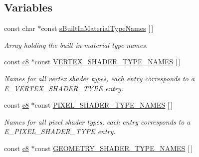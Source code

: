 \subsection*{Variables}
\begin{DoxyCompactItemize}
\item 
\mbox{\label{namespaceirr_1_1video_a833460ba01098710b6df3ec5c281c873}} 
const char $\ast$const \hyperlink{namespaceirr_1_1video_a833460ba01098710b6df3ec5c281c873}{s\+Built\+In\+Material\+Type\+Names} \mbox{[}$\,$\mbox{]}
\begin{DoxyCompactList}\small\item\em Array holding the built in material type names. \end{DoxyCompactList}\item 
\mbox{\label{namespaceirr_1_1video_a296c30d8c7591c4e083f7b7e2d4b35ad}} 
const \hyperlink{namespaceirr_a9395eaea339bcb546b319e9c96bf7410}{c8} $\ast$const \hyperlink{namespaceirr_1_1video_a296c30d8c7591c4e083f7b7e2d4b35ad}{V\+E\+R\+T\+E\+X\+\_\+\+S\+H\+A\+D\+E\+R\+\_\+\+T\+Y\+P\+E\+\_\+\+N\+A\+M\+ES} \mbox{[}$\,$\mbox{]}
\begin{DoxyCompactList}\small\item\em Names for all vertex shader types, each entry corresponds to a E\+\_\+\+V\+E\+R\+T\+E\+X\+\_\+\+S\+H\+A\+D\+E\+R\+\_\+\+T\+Y\+PE entry. \end{DoxyCompactList}\item 
\mbox{\label{namespaceirr_1_1video_a4a0a5ebb62ca1b59a6bfb8e9fe81b250}} 
const \hyperlink{namespaceirr_a9395eaea339bcb546b319e9c96bf7410}{c8} $\ast$const \hyperlink{namespaceirr_1_1video_a4a0a5ebb62ca1b59a6bfb8e9fe81b250}{P\+I\+X\+E\+L\+\_\+\+S\+H\+A\+D\+E\+R\+\_\+\+T\+Y\+P\+E\+\_\+\+N\+A\+M\+ES} \mbox{[}$\,$\mbox{]}
\begin{DoxyCompactList}\small\item\em Names for all pixel shader types, each entry corresponds to a E\+\_\+\+P\+I\+X\+E\+L\+\_\+\+S\+H\+A\+D\+E\+R\+\_\+\+T\+Y\+PE entry. \end{DoxyCompactList}\item 
\mbox{\label{namespaceirr_1_1video_ab077dcb9a1ac7cf2a0988fc3e29714da}} 
const \hyperlink{namespaceirr_a9395eaea339bcb546b319e9c96bf7410}{c8} $\ast$const \hyperlink{namespaceirr_1_1video_ab077dcb9a1ac7cf2a0988fc3e29714da}{G\+E\+O\+M\+E\+T\+R\+Y\+\_\+\+S\+H\+A\+D\+E\+R\+\_\+\+T\+Y\+P\+E\+\_\+\+N\+A\+M\+ES} \mbox{[}$\,$\mbox{]}

\end{DoxyCompactItemize}
